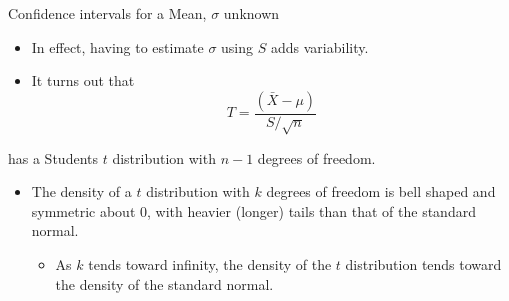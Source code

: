 \documentclass[
  ignorenonframetext,
]{beamer}
\providecommand{\tightlist}{%
  \setlength{\itemsep}{0pt}\setlength{\parskip}{0pt}}
\begin{document}
\begin{frame}{Confidence intervals for a Mean, \(\sigma\) unknown}
\protect\hypertarget{confidence-intervals-for-a-mean-sigma-unknown-3}{}
\begin{itemize}
\item
  In effect, having to estimate \(\sigma\) using \(S\) adds variability.
\item
  It turns out that \[T=\frac{(\bar{X}-\mu)}{S/\sqrt{n}}\]
\end{itemize}

has a Students \(t\) distribution with \(n-1\) degrees of freedom.

\begin{itemize}
\item
  The density of a \(t\) distribution with \(k\) degrees of freedom is
  bell shaped and symmetric about 0, with heavier (longer) tails than
  that of the standard normal.

  \begin{itemize}
  \tightlist
  \item
    As \(k\) tends toward infinity, the density of the \(t\)
    distribution tends toward the density of the standard normal.
  \end{itemize}
\end{itemize}
\end{frame}
\end{document}
